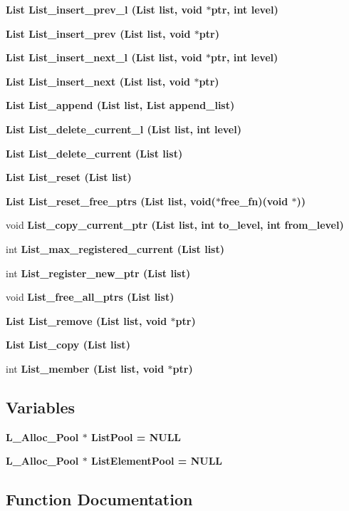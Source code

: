 \begin{CompactItemize}
\bf{List} \bf{List\_\-insert\_\-prev\_\-l} (\bf{List} \bf{list}, void $\ast$ptr, int level)
\item 
\bf{List} \bf{List\_\-insert\_\-prev} (\bf{List} \bf{list}, void $\ast$ptr)
\item 
\bf{List} \bf{List\_\-insert\_\-next\_\-l} (\bf{List} \bf{list}, void $\ast$ptr, int level)
\item 
\bf{List} \bf{List\_\-insert\_\-next} (\bf{List} \bf{list}, void $\ast$ptr)
\item 
\bf{List} \bf{List\_\-append} (\bf{List} \bf{list}, \bf{List} append\_\-list)
\item 
\bf{List} \bf{List\_\-delete\_\-current\_\-l} (\bf{List} \bf{list}, int level)
\item 
\bf{List} \bf{List\_\-delete\_\-current} (\bf{List} \bf{list})
\item 
\bf{List} \bf{List\_\-reset} (\bf{List} \bf{list})
\item 
\bf{List} \bf{List\_\-reset\_\-free\_\-ptrs} (\bf{List} \bf{list}, void($\ast$free\_\-fn)(void $\ast$))
\item 
void \bf{List\_\-copy\_\-current\_\-ptr} (\bf{List} \bf{list}, int to\_\-level, int from\_\-level)
\item 
int \bf{List\_\-max\_\-registered\_\-current} (\bf{List} \bf{list})
\item 
int \bf{List\_\-register\_\-new\_\-ptr} (\bf{List} \bf{list})
\item 
void \bf{List\_\-free\_\-all\_\-ptrs} (\bf{List} \bf{list})
\item 
\bf{List} \bf{List\_\-remove} (\bf{List} \bf{list}, void $\ast$ptr)
\item 
\bf{List} \bf{List\_\-copy} (\bf{List} \bf{list})
\item 
int \bf{List\_\-member} (\bf{List} \bf{list}, void $\ast$ptr)
\end{CompactItemize}
\subsection*{Variables}
\begin{CompactItemize}
\item 
\bf{L\_\-Alloc\_\-Pool} $\ast$ \bf{List\-Pool} = NULL
\item 
\bf{L\_\-Alloc\_\-Pool} $\ast$ \bf{List\-Element\-Pool} = NULL
\end{CompactItemize}


\subsection{Function Documentation}
